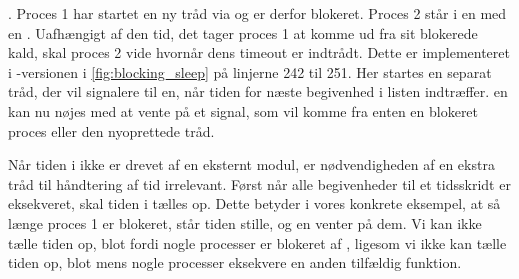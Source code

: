 . Proces 1 har startet en ny tråd via  og er derfor blokeret. Proces 2 står i en  med en . Uafhængigt af den tid, det tager proces 1 at komme ud fra sit blokerede kald, skal proces 2 vide hvornår dens timeout er indtrådt. Dette er implementeret i -versionen i \cref{fig:blocking_sleep} på linjerne 242 til 251. Her startes en separat tråd, der vil signalere til \sched en, når tiden for næste begivenhed i  listen indtræffer. \Sched en kan nu nøjes med at vente på et signal, som vil komme fra enten en blokeret proces eller den nyoprettede tråd.

Når tiden i \des ikke er drevet af en eksternt modul, er nødvendigheden af en ekstra tråd til  håndtering af tid irrelevant. Først når alle begivenheder til et tidsskridt er eksekveret, skal tiden i \des tælles op. Dette betyder i vores konkrete eksempel, at  så længe proces 1 er blokeret, står tiden stille, og  \sched en venter på dem. Vi kan ikke tælle tiden op, blot fordi nogle processer er blokeret af , ligesom vi ikke kan tælle tiden op, blot mens nogle processer eksekvere en anden tilfældig funktion.

